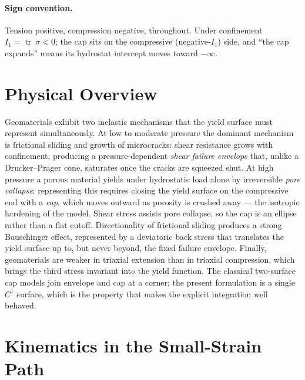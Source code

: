 \documentclass[12pt]{article}
\DeclareMathOperator{\trace}{tr}
\newcommand{\stress}{~\sigma}
\begin{document}
\paragraph{Sign convention.}
Tension positive, compression negative, throughout. Under
confinement $I_1 = \trace\stress < 0$; the cap sits on the
compressive (negative-$I_1$) side, and ``the cap expands'' means its
hydrostat intercept moves toward $-\infty$.

\section{Physical Overview}
\label{sec:physics}

Geomaterials exhibit two inelastic mechanisms that the yield surface
must represent simultaneously. At low to moderate pressure the
dominant mechanism is frictional sliding and growth of microcracks:
shear resistance grows with confinement, producing a pressure-dependent
\emph{shear failure envelope} that, unlike a Drucker--Prager cone,
saturates once the cracks are squeezed shut. At high pressure a
porous material yields under hydrostatic load alone by irreversible
\emph{pore collapse}; representing this requires closing the yield
surface on the compressive end with a \emph{cap}, which moves outward
as porosity is crushed away --- the isotropic hardening of the model.
Shear stress assists pore collapse, so the cap is an ellipse rather
than a flat cutoff. Directionality of frictional sliding produces a
strong Bauschinger effect, represented by a deviatoric back stress
that translates the yield surface up to, but never beyond, the fixed
failure envelope. Finally, geomaterials are weaker in triaxial
extension than in triaxial compression, which brings the third stress
invariant into the yield function. The classical two-surface cap
models \citep[e.g.][]{Fossum.Fredrich:2000} join envelope and cap at
a corner; the present formulation is a single $C^1$ surface, which is
the property that makes the explicit integration well behaved.

\section{Kinematics in the Small-Strain Path}
\label{sec:smallstrain}
\end{document}
